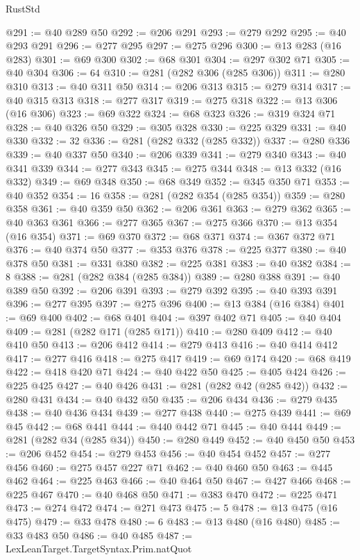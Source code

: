 \begin{lexlean}{RustStd}
\begin{coremodule}
@291 := @40 @289 @50
@292 := @206 @291
@293 := @279 @292
@295 := @40 @293 @291
@296 := @277 @295
@297 := @275 @296
@300 := @13 @283 (@16 @283)
@301 := @69 @300
@302 := @68 @301
@304 := @297 @302 @71
@305 := @40 @304
@306 := 64
@310 := @281 (@282 @306 (@285 @306))
@311 := @280 @310
@313 := @40 @311 @50
@314 := @206 @313
@315 := @279 @314
@317 := @40 @315 @313
@318 := @277 @317
@319 := @275 @318
@322 := @13 @306 (@16 @306)
@323 := @69 @322
@324 := @68 @323
@326 := @319 @324 @71
@328 := @40 @326 @50
@329 := @305 @328
@330 := @225 @329
@331 := @40 @330
@332 := 32
@336 := @281 (@282 @332 (@285 @332))
@337 := @280 @336
@339 := @40 @337 @50
@340 := @206 @339
@341 := @279 @340
@343 := @40 @341 @339
@344 := @277 @343
@345 := @275 @344
@348 := @13 @332 (@16 @332)
@349 := @69 @348
@350 := @68 @349
@352 := @345 @350 @71
@353 := @40 @352
@354 := 16
@358 := @281 (@282 @354 (@285 @354))
@359 := @280 @358
@361 := @40 @359 @50
@362 := @206 @361
@363 := @279 @362
@365 := @40 @363 @361
@366 := @277 @365
@367 := @275 @366
@370 := @13 @354 (@16 @354)
@371 := @69 @370
@372 := @68 @371
@374 := @367 @372 @71
@376 := @40 @374 @50
@377 := @353 @376
@378 := @225 @377
@380 := @40 @378 @50
@381 := @331 @380
@382 := @225 @381
@383 := @40 @382
@384 := 8
@388 := @281 (@282 @384 (@285 @384))
@389 := @280 @388
@391 := @40 @389 @50
@392 := @206 @391
@393 := @279 @392
@395 := @40 @393 @391
@396 := @277 @395
@397 := @275 @396
@400 := @13 @384 (@16 @384)
@401 := @69 @400
@402 := @68 @401
@404 := @397 @402 @71
@405 := @40 @404
@409 := @281 (@282 @171 (@285 @171))
@410 := @280 @409
@412 := @40 @410 @50
@413 := @206 @412
@414 := @279 @413
@416 := @40 @414 @412
@417 := @277 @416
@418 := @275 @417
@419 := @69 @174
@420 := @68 @419
@422 := @418 @420 @71
@424 := @40 @422 @50
@425 := @405 @424
@426 := @225 @425
@427 := @40 @426
@431 := @281 (@282 @42 (@285 @42))
@432 := @280 @431
@434 := @40 @432 @50
@435 := @206 @434
@436 := @279 @435
@438 := @40 @436 @434
@439 := @277 @438
@440 := @275 @439
@441 := @69 @45
@442 := @68 @441
@444 := @440 @442 @71
@445 := @40 @444
@449 := @281 (@282 @34 (@285 @34))
@450 := @280 @449
@452 := @40 @450 @50
@453 := @206 @452
@454 := @279 @453
@456 := @40 @454 @452
@457 := @277 @456
@460 := @275 @457 @227 @71
@462 := @40 @460 @50
@463 := @445 @462
@464 := @225 @463
@466 := @40 @464 @50
@467 := @427 @466
@468 := @225 @467
@470 := @40 @468 @50
@471 := @383 @470
@472 := @225 @471
@473 := @274 @472
@474 := @271 @473
@475 := 5
@478 := @13 @475 (@16 @475)
@479 := @33 @478
@480 := 6
@483 := @13 @480 (@16 @480)
@485 := @33 @483 @50
@486 := @40 @485
@487 := LexLeanTarget.TargetSyntax.Prim.natQuot

\end{coremodule}
\end{lexlean}
